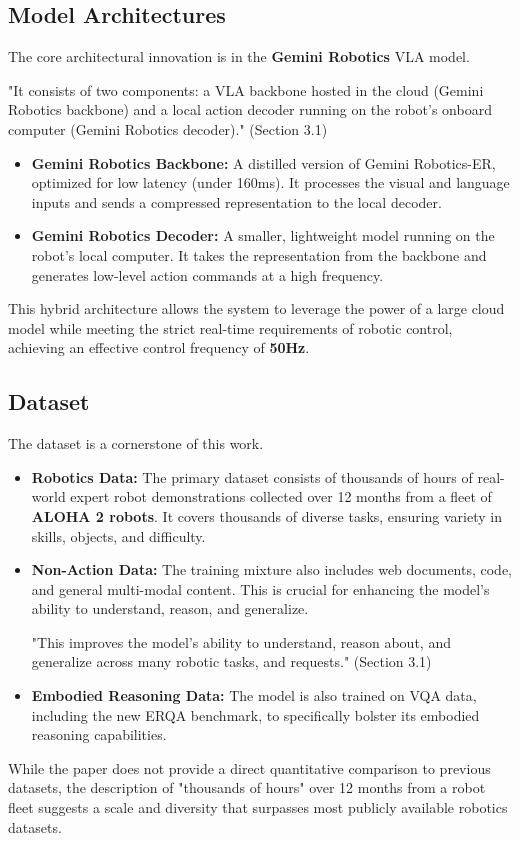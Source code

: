 \documentclass{article}
\begin{document}
\subsection{Model Architectures}
The core architectural innovation is in the \textbf{Gemini Robotics} VLA model.

\begin{mdframed}[backgroundcolor=gray!10]
"It consists of two components: a VLA backbone hosted in the cloud (Gemini Robotics backbone) and a local action decoder running on the robot's onboard computer (Gemini Robotics decoder)." (Section 3.1)
\end{mdframed}

\begin{itemize}
    \item \textbf{Gemini Robotics Backbone:} A distilled version of Gemini Robotics-ER, optimized for low latency (under 160ms). It processes the visual and language inputs and sends a compressed representation to the local decoder.
    \item \textbf{Gemini Robotics Decoder:} A smaller, lightweight model running on the robot's local computer. It takes the representation from the backbone and generates low-level action commands at a high frequency.
\end{itemize}
This hybrid architecture allows the system to leverage the power of a large cloud model while meeting the strict real-time requirements of robotic control, achieving an effective control frequency of \textbf{50Hz}.

\subsection{Dataset}
The dataset is a cornerstone of this work.

\begin{itemize}
    \item \textbf{Robotics Data:} The primary dataset consists of thousands of hours of real-world expert robot demonstrations collected over 12 months from a fleet of \textbf{ALOHA 2 robots}. It covers thousands of diverse tasks, ensuring variety in skills, objects, and difficulty.
    \item \textbf{Non-Action Data:} The training mixture also includes web documents, code, and general multi-modal content. This is crucial for enhancing the model's ability to understand, reason, and generalize.
    \begin{mdframed}[backgroundcolor=gray!10]
    "This improves the model's ability to understand, reason about, and generalize across many robotic tasks, and requests." (Section 3.1)
    \end{mdframed}
    \item \textbf{Embodied Reasoning Data:} The model is also trained on VQA data, including the new ERQA benchmark, to specifically bolster its embodied reasoning capabilities.
\end{itemize}
While the paper does not provide a direct quantitative comparison to previous datasets, the description of "thousands of hours" over 12 months from a robot fleet suggests a scale and diversity that surpasses most publicly available robotics datasets.
\end{document}
